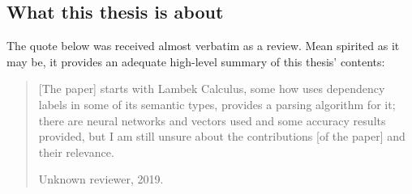 {\subsection*{What this thesis is about}
The quote below was received almost verbatim as a review.
Mean spirited as it may be, it provides an adequate high-level summary of this thesis' contents: 
\begin{quote}
[The paper] starts with Lambek Calculus, some how uses dependency labels in some of its semantic types, provides a parsing algorithm for it; there are neural networks and vectors used and some accuracy results provided, but I am still unsure about the contributions [of the paper] and their relevance.
\begin{flushright} Unknown reviewer, 2019.\end{flushright}
\end{quote}

}
